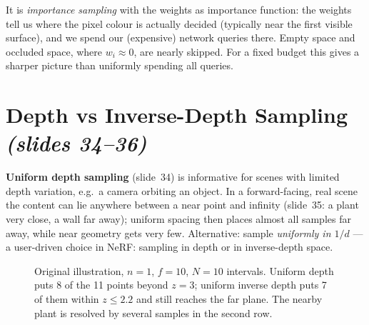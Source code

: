 \documentclass[11pt,a4paper]{article}
\newcommand{\sref}[1]{\texorpdfstring{\emph{(slides #1)}}{(slides #1)}}
\theoremstyle{definition}
\theoremstyle{plain}
\begin{document}
\begin{intuition}
It is \emph{importance sampling} with the weights as importance function: the weights tell us where the pixel colour is actually decided (typically near the first visible surface), and we spend our (expensive) network queries there. Empty space and occluded space, where $w_i\approx0$, are nearly skipped. For a fixed budget this gives a sharper picture than uniformly spending all queries.
\end{intuition}

\section{Depth vs Inverse-Depth Sampling \sref{34--36}}

\textbf{Uniform depth sampling} (slide~34) is informative for scenes with limited depth variation, e.g.\ a camera orbiting an object. In a forward-facing, real scene the content can lie anywhere between a near point and infinity (slide~35: a plant very close, a wall far away); uniform spacing then places almost all samples far away, while near geometry gets very few. Alternative: sample \emph{uniformly in $1/d$} --- a user-driven choice in NeRF: sampling in depth or in inverse-depth space.

\begin{figure}[H]
\centering
{}
\caption{Original illustration, $n=1$, $f=10$, $N=10$ intervals. Uniform depth puts 8 of the 11 points beyond $z=3$; uniform inverse depth puts 7 of them within $z\le2.2$ and still reaches the far plane. The nearby plant is resolved by several samples in the second row.}
\end{figure}
\end{document}
